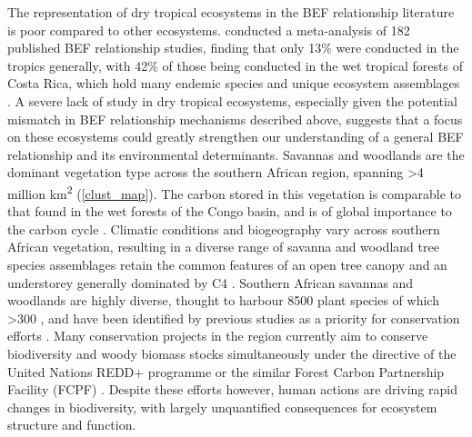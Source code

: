 \documentclass[11pt,a4paper]{article}
\newcommand{\textapprox}{\raisebox{0.5ex}{\texttildelow}}  %
\begin{document}
The representation of dry tropical ecosystems in the BEF relationship literature is poor compared to other ecosystems. \citet{Clarke2017} conducted a meta-analysis of 182 published BEF relationship studies, finding that only 13\% were conducted in the tropics generally, with 42\% of those being conducted in the wet tropical forests of Costa Rica, which hold many endemic species and unique ecosystem assemblages \citep{Barthlott2005}. A severe lack of study in dry tropical ecosystems, especially given the potential mismatch in BEF relationship mechanisms described above, suggests that a focus on these ecosystems could greatly strengthen our understanding of a general BEF relationship and its environmental determinants. Savannas and woodlands are the dominant vegetation type across the southern African region, spanning >4 million km\textsuperscript{2} \citep{White1987, Ratnam2011, Ryan2016} (\autoref{clust_map}). The carbon stored in this vegetation is comparable to that found in the wet forests of the Congo basin, and is of global importance to the carbon cycle \citep{Houghton2009, Mayaux2008}. Climatic conditions and biogeography vary across southern African vegetation, resulting in a diverse range of savanna and woodland tree species assemblages retain the common features of an open tree canopy and an understorey generally dominated by C4 . Southern African savannas and woodlands are highly diverse, thought to harbour \textapprox{}8500 plant species of which  >300   \citep{Frost1996}, and have been identified by previous studies as a priority for conservation efforts \citep{Byers2001, Mittermeier2003}. Many conservation projects in the region currently aim to conserve biodiversity and woody biomass stocks simultaneously under the directive of the United Nations REDD+ programme or the similar Forest Carbon Partnership Facility (FCPF) \citep{Hinsley2015}. Despite these efforts however, human actions are driving rapid changes in biodiversity, with largely unquantified consequences for ecosystem structure and function.
\end{document}
